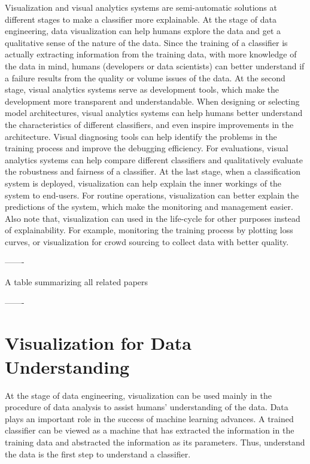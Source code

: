 Visualization and visual analytics systems are semi-automatic solutions at different stages to make a classifier more explainable. At the stage of data engineering, data visualization can help humans explore the data and get a qualitative sense of the nature of the data. Since the training of a classifier is actually extracting information from the training data, with more knowledge of the data in mind, humans (\ie developers or data scientists) can better understand if a failure results from the quality or volume issues of the data. At the second stage, visual analytics systems serve as development tools, which make the development more transparent and understandable. When designing or selecting model architectures, visual analytics systems can help humans better understand the characteristics of different classifiers, and even inspire improvements in the architecture. Visual diagnosing tools can help identify the problems in the training process and improve the debugging efficiency. For evaluations, visual analytics systems can help compare different classifiers and qualitatively evaluate the robustness and fairness of a classifier. At the last stage, when a classification system is deployed, visualization can help explain the inner workings of the system to end-users. For routine operations, visualization can better explain the predictions of the system, which make the monitoring and management easier. Also note that, visualization can used in the life-cycle for other purposes instead of explainability. For example, monitoring the training process by plotting loss curves, or visualization for crowd sourcing to collect data with better quality.

-------

A table summarizing all related papers

-------

\section{Visualization for Data Understanding}

At the stage of data engineering, visualization can be used mainly in the procedure of data analysis to assist humans' understanding of the data. Data plays an important role in the success of machine learning advances. A trained classifier can be viewed as a machine that has extracted the information in the training data and abstracted the information as its parameters. Thus, understand the data is the first step to understand a classifier.

